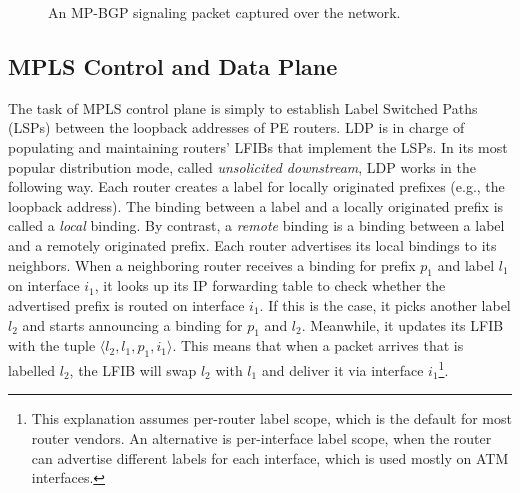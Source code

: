 \documentclass{article}
\begin{document}
\begin{figure}
\centering
 \caption{An MP-BGP signaling packet captured over the network.}
 \label{fig:mpls-slides-26}
\end{figure}


%
%
\subsection{MPLS Control and Data Plane}
The task of MPLS control plane is simply to establish Label Switched Paths 
(LSPs) between the loopback addresses of PE routers. LDP is in charge of 
populating and maintaining routers' LFIBs that implement the LSPs. In its most 
popular distribution mode, called \emph{unsolicited downstream}, LDP works in 
the following way. Each router creates a label for locally originated prefixes 
(e.g., the loopback address). The binding between a label and a locally 
originated prefix is called a \emph{local} binding. By contrast, a \emph{remote} 
binding is a binding between a label and a remotely originated prefix. Each 
router advertises its local bindings to its neighbors. When a neighboring router 
receives a binding for prefix $p_1$ and label $l_1$ on interface $i_1$, it looks 
up its IP forwarding table to check whether the advertised prefix is routed on 
interface $i_1$. If this is the case, it picks another label $l_2$ and starts 
announcing a binding for $p_1$ and $l_2$. Meanwhile, it updates its LFIB with 
the tuple $\langle l_2, l_1, p_1, i_1 \rangle$. This means that when a packet arrives that is 
labelled $l_2$, the LFIB will swap $l_2$ with $l_1$ and deliver it via interface 
$i_1$\footnote{This explanation assumes per-router label scope, which is the 
default for most router vendors. An alternative is per-interface label scope, 
when the router can advertise different labels for each interface, which is 
used mostly on ATM interfaces.}.
\end{document}
